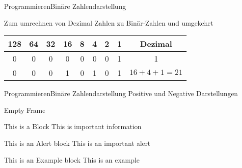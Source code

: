 \begin{frame}{Programmieren}{Binäre Zahlendarstellung}

		Zum umrechnen von Dezimal Zahlen zu Binär-Zahlen und umgekehrt
	
		\begin{tabular}{cccccccc|c}
		128 & 64 & 32 & 16 & 8 & 4 & 2 & 1 & Dezimal \\ \hline 
		0   & 0  & 0  & 0  & 0 & 0 & 0 & 1 & 1 \\ 
		0   & 0  & 0  & 1  & 0 & 1 & 0 & 1 & $16 + 4 + 1 = 21$ \\ 
		\hline 
		\end{tabular} 	
		
		
		
\end{frame}




\begin{frame}{Programmieren}{Binäre Zahlendarstellung}
	Positive und Negative Darstellungen
	

\end{frame}


\begin{frame}[plain]
	Empty Frame
	 
	\begin{block}{This is a Block}
      This is important information
   \end{block}
 
   \begin{alertblock}{This is an Alert block}
   This is an important alert
   \end{alertblock}
 
   \begin{exampleblock}{This is an Example block}
   This is an example 
   \end{exampleblock}
\end{frame}


